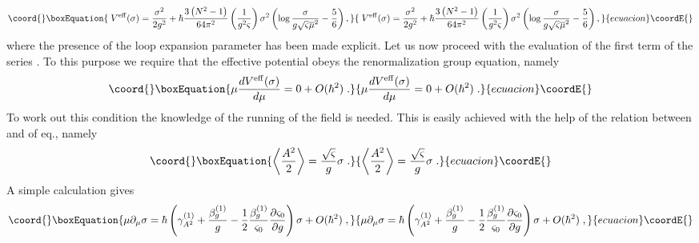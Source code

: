 \documentclass[a4paper,12pt]{article}
\begin{document}
\begin{equation}\coord{}\boxEquation{
\;V^{\mathrm{eff}}(\sigma )=\frac{\sigma ^{2}}{2g^{2}}+\hbar \frac{3\left(
N^{2}-1\right) }{64\pi ^{2}}\left( \frac{1}{g^{2}\varsigma }\right) \sigma
^{2}\left( \log \frac{\sigma }{g\sqrt{\varsigma }\overline{\mu }^{2}}-\frac{5
}{6}\right) ,  \label{pf}
}{
\;V^{\mathrm{eff}}(\sigma )=\frac{\sigma ^{2}}{2g^{2}}+\hbar \frac{3\left(
N^{2}-1\right) }{64\pi ^{2}}\left( \frac{1}{g^{2}\varsigma }\right) \sigma
^{2}\left( \log \frac{\sigma }{g\sqrt{\varsigma }\overline{\mu }^{2}}-\frac{5
}{6}\right) ,  }{ecuacion}\coordE{}\end{equation}
where the presence of the loop expansion parameter \myHighlight{$\hbar $}\coordHE{} has been made
explicit. Let us now proceed with the evaluation of the first term of the
series \myHighlight{$\left( \ref{ls}\right) $}\coordHE{}. To this purpose we require that the
effective potential \coordHE{} obeys the renormalization
group equation, namely 
\begin{equation}\coord{}\boxEquation{
\mu \frac{dV^{\mathrm{eff}}(\sigma )}{d\mu }=0+O(\hbar ^{2})\;.  \label{aeq}
}{
\mu \frac{dV^{\mathrm{eff}}(\sigma )}{d\mu }=0+O(\hbar ^{2})\;.  }{ecuacion}\coordE{}\end{equation}
To work out this condition the knowledge of the running of the field \myHighlight{$\sigma 
$}\coordHE{} is needed. This is easily achieved with the help of the relation between \myHighlight{$%
\sigma $}\coordHE{} and \coordHE{} of eq.\myHighlight{$\left( \ref{ff}%
\right) $}\coordHE{}, namely 
\begin{equation}\coord{}\boxEquation{
\left\langle \frac{A^{2}}{2}\right\rangle =\frac{\sqrt{\varsigma }}{g}\sigma
\;.  \label{ffr}
}{
\left\langle \frac{A^{2}}{2}\right\rangle =\frac{\sqrt{\varsigma }}{g}\sigma
\;.  }{ecuacion}\coordE{}\end{equation}
A simple calculation gives 
\begin{equation}\coord{}\boxEquation{
\mu \partial _{\mu }\sigma =\hbar \left( \gamma _{A^{2}}^{(1)}+\frac{\beta
_{g}^{(1)}}{g}-\frac{1}{2}\frac{\beta _{g}^{(1)}}{\varsigma _{0}}\frac{
\partial \varsigma _{0}}{\partial g}\right) \sigma +O(\hbar ^{2})\;,
\label{mds}
}{
\mu \partial _{\mu }\sigma =\hbar \left( \gamma _{A^{2}}^{(1)}+\frac{\beta
_{g}^{(1)}}{g}-\frac{1}{2}\frac{\beta _{g}^{(1)}}{\varsigma _{0}}\frac{
\partial \varsigma _{0}}{\partial g}\right) \sigma +O(\hbar ^{2})\;,
}{ecuacion}\coordE{}\end{equation}
\end{document}
